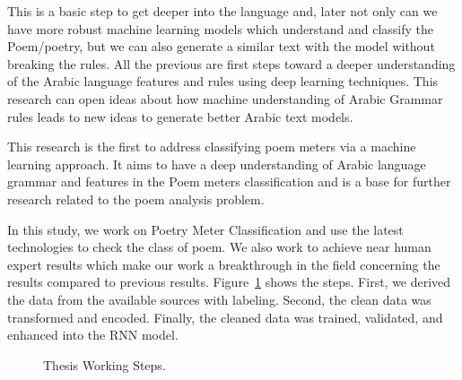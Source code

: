 This is a basic step to get deeper into the language and, later not only can we have more robust machine learning models which understand and classify the Poem/poetry, but we can also generate a similar text with the model without breaking the rules. All the previous are first steps toward a deeper understanding of the Arabic language features and rules using deep learning techniques. This research can open ideas about how machine understanding of Arabic Grammar rules leads to new ideas to generate better Arabic text models.

This research is the first to address classifying poem meters via a machine learning approach. It aims to have a deep understanding of Arabic language grammar and features in the Poem meters classification and is a base for further research related to the poem analysis problem.

In this study, we work on Poetry Meter Classification and use the latest technologies to check the class of poem. We also work to achieve near human expert results which make our work a breakthrough in the field concerning the results compared to previous results. Figure~\ref{Fig:Thesis_Cycle} shows the steps. First, we derived the data from the available sources with labeling. Second, the clean data was transformed and encoded. Finally, the cleaned data was trained, validated, and enhanced into the RNN model.
\begin{figure}[!ht]
	
	\caption{Thesis Working Steps.}
	\label{Fig:Thesis_Cycle}
\end{figure}




